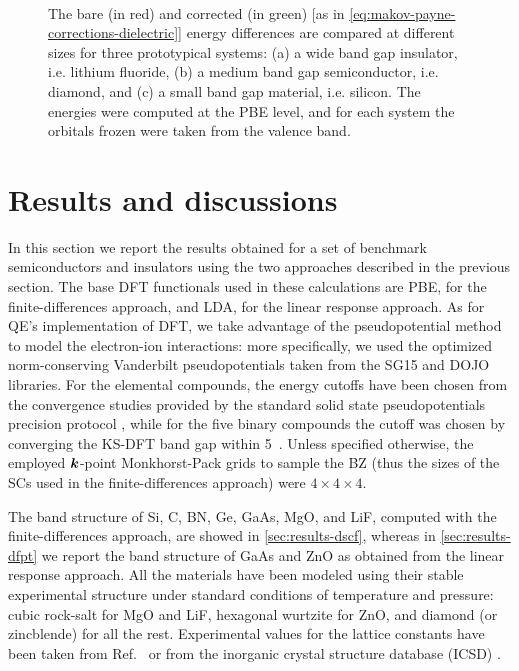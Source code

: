 \begin{figure}
    \centering
     \\
    \caption[Convergence finite-size corrections for the finite-differences method]{The bare (in red) and corrected (in green) [as in \cref{eq:makov-payne-corrections-dielectric}] energy differences are compared at different sizes for three prototypical systems: (a) a wide band gap insulator, i.e. lithium fluoride, (b) a medium band gap semiconductor, i.e. diamond, and (c) a small band gap material, i.e. silicon. The energies were computed at the PBE level, and for each system the orbitals frozen were taken from the valence band.}
    \label{fig:convergence-makov-payne}
\end{figure}

\section{Results and discussions\label{sec:results-bands}}
In this section we report the results obtained for a set of benchmark semiconductors and insulators using the two approaches described in the previous section. The base DFT functionals used in these calculations are PBE, for the finite-differences approach, and LDA, for the linear response approach. As for QE's implementation of DFT, we take advantage of the pseudopotential method to model the electron-ion interactions: more specifically, we used the optimized norm-conserving Vanderbilt pseudopotentials \cite{hamann_optimized_2013,hamann_erratum_2017} taken from the SG15 \cite{schlipf_optimization_2015} and DOJO \cite{van_setten_pseudodojo_2018} libraries. For the elemental compounds, the energy cutoffs have been chosen from the convergence studies provided by the standard solid state pseudopotentials precision protocol \cite{prandini_precision_2018}, while for the five binary compounds the cutoff was chosen by converging the KS-DFT band gap within 5~\mev. Unless specified otherwise, the employed ${\bm k}$-point Monkhorst-Pack grids to sample the BZ (thus the sizes of the SCs used in the finite-differences approach) were $4\times 4\times 4$.

The band structure of Si, C, BN, Ge, GaAs, MgO, and LiF, computed with the finite-differences approach, are showed in \cref{sec:results-dscf}, whereas in \cref{sec:results-dfpt} we report the band structure of GaAs and ZnO as obtained from the linear response approach. All the materials have been modeled using their stable experimental structure under standard conditions of temperature and pressure: cubic rock-salt for MgO and LiF, hexagonal wurtzite for ZnO, and diamond (or zincblende) for all the rest. Experimental values for the lattice constants have been taken from Ref.~\cite{madelung_semiconductors_2004} or from the inorganic crystal structure database (ICSD) \cite{icsd_website}.

